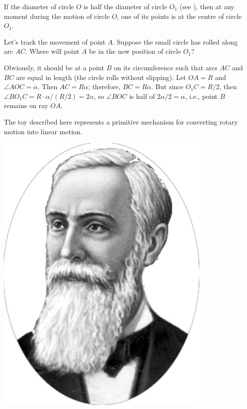 \ans If the diameter of circle $O$ is half the diameter of circle $O_{1}$ (see ), then at any moment during the motion of circle $O$, one of its points is at the centre of circle $O_{1}$.

Let's track the movement of point $A$. Suppose the small circle has rolled along arc $AC$. Where will point $A$ be in the new position of circle $O_{1}$?

Obviously, it should be at a point $B$ on its circumference such that arcs $AC$ and $BC$ are equal in length (the circle rolls without slipping). Let $OA = R$ and $\angle AOC = \alpha$. Then $AC = R\alpha$; therefore, $BC = R \alpha$. But since $O_{1}C = R/2$, then $\angle BO_{1}C = R \cdot \alpha/(R/2) = 2 \alpha$, so $\angle BOC$ is half of $2 \alpha/2 = \alpha$, i.e., point $B$ remains on ray $OA$.

The toy described here represents a primitive mechanism for converting rotary motion into linear motion.


\begin{marginfigure}[-2cm]%
\centering
\includegraphics[width=0.8\textwidth]{figures/ch-09/fig-134a.pdf}
\end{marginfigure}



